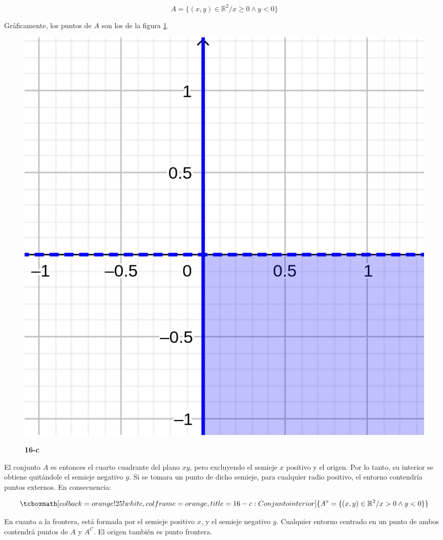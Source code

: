 \documentclass{article}
\renewcommand{\Bbb}{\mathbb}
\begin{document}
\begin{enumerate}[(a)]
\begin{equation}
A = \{ (x,y) \in \Bbb R^2 / x \geq 0 \wedge y < 0 \}
\end{equation}

Gráficamente, los puntos de $A$ son los de la figura \ref{fig:1-16-c}.

\begin{figure}[ht]
\caption{\textbf{16-c}}
\includegraphics[scale=2.5]{img/ejercicios/1/16-c.png} 
\centering
\label{fig:1-16-c}
\end{figure}

El conjunto $A$ es entonces el cuarto cuadrante del plano $xy$, pero excluyendo el semieje $x$ positivo y el origen. Por lo tanto, su interior se obtiene quitándole el semieje negativo $y$. Si se tomara un punto de dicho semieje, para cualquier radio positivo, el entorno contendría puntos externos. En consecuencia:

\begin{equation}
\tcboxmath[colback=orange!25!white,colframe=orange, title=16-c: Conjunto interior]
{ A^{\circ} = \{ (x, y) \in \Bbb R^2 / x > 0 \wedge y < 0 \}  }
\end{equation}

En cuanto a la frontera, está formada por el semieje positivo $x$, y el semieje negativo $y$. Cualquier entorno centrado en un punto de ambos contendrá puntos de $A$ y $A^C$. El origen también es punto frontera.


\end{enumerate}
\end{document}

